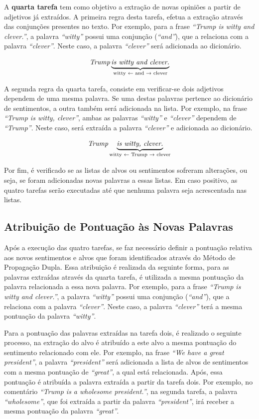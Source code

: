 A \textbf{quarta tarefa} tem como objetivo a extração de novas opiniões a partir
de adjetivos já extraídos. A primeira regra desta tarefa, efetua a extração através
das conjunções presentes no texto. Por exemplo, para a frase \textit{``Trump is
witty and clever.''}, a palavra \textit{``witty''} possui uma conjunção
(\textit{``and''}), que a relaciona com a palavra \textit{``clever''}. Neste
caso, a palavra \textit{``clever''} será adicionada ao dicionário.

\[\textit{Trump} \underbrace{\textit{is witty and clever.}}_\text{witty
\textleftarrow \text{ and} \textrightarrow \text{ clever}}\]


A segunda regra da quarta tarefa, consiste em verificar-se dois adjetivos
dependem de uma mesma palavra. Se uma destas palavras pertence ao dicionário de
sentimentos, a outra também será adicionada na lista. Por exemplo, na frase
\textit{``Trump is witty, clever''}, ambas as palavras \textit{``witty''} e
\textit{``clever''} dependem de \textit{``Trump''}. Neste caso, será extraída a
palavra \textit{``clever''} e adicionada ao dicionário.

\[\textit{Trump} \underbrace{\textit{is witty, clever.}}_\text{witty
\textleftarrow \text{ Trump} \textrightarrow \text{ clever}}\]

Por fim, é verificado se as listas de alvos ou sentimentos sofreram
alterações, ou seja, se foram adicionadas novas palavras a essas listas. Em caso
positivo, as quatro tarefas serão executadas até que nenhuma palavra seja
acrescentada nas listas.

\subsection{Atribuição de Pontuação às Novas Palavras}

Após a execução das quatro tarefas, se faz necessário definir a
pontuação relativa aos novos sentimentos e alvos que foram identificados através
do Método de Propagação Dupla. Essa atribuição é realizada da seguinte forma,
para as palavras extraídas através da quarta tarefa, é utilizada a mesma pontuação da palavra relacionada a
essa nova palavra. Por exemplo, para a frase \textit{``Trump is
witty and clever.''}, a palavra \textit{``witty''} possui uma conjunção
(\textit{``and''}), que a relaciona com a palavra \textit{``clever''}. Neste
caso, a palavra \textit{``clever''} terá a mesma pontuação da palavra
\textit{``witty''}.

Para a pontuação das palavras extraídas na tarefa dois, é realizado o seguinte
processo, na extração do alvo é atribuído a este alvo a mesma pontuação do
sentimento relacionado com ele. Por exemplo, na frase \textit{``We have a great
president''}, a palavra \textit{``president''} será adicionada a lista de alvos
de sentimentos com a mesma pontuação de \textit{``great''}, a qual está
relacionada. Após, essa pontuação é atribuída a palavra extraída a partir
da tarefa dois.
Por exemplo, no comentário \textit{``Trump is a wholesome president.''}, na
segunda tarefa, a palavra \textit{``wholesome''}, que foi extraída a partir da
palavra \textit{``president''}, irá receber a mesma pontuação da palavra
\textit{``great''}.

